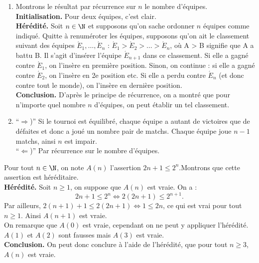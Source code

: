 \begin{Soln}{38}
\begin{enumerate}
\item Montrons le résultat par récurrence sur $n$ le nombre d'équipes.\\
\textbf{Initialisation.} Pour deux équipes, c'est clair.\\
\textbf{Hérédité.} Soit $n\in \N$ et supposons qu'on sache ordonner $n$ équipes comme indiqué. Quitte à renuméroter les équipes, supposons qu'on ait le classement suivant des équipes $\acute E_1,\ldots,\acute
E_n$ : $\acute E_1 > \acute E_2 > \ldots > \acute E_n$, où A > B signifie que A a battu B. Il s'agit d'insérer l'équipe $\acute E_{n+1}$ dans ce classement. Si elle a gagné contre $\acute E_1$, on l'insère en première position. Sinon, on continue : si elle a gagné contre $\acute E_2$, on l'insère en 2e position etc. Si elle a perdu contre $\acute E_n$ (et donc contre tout le monde), on l'insère en dernière position.\\
\textbf{Conclusion.} D'après le principe de récurrence, on a montré que pour n'importe quel nombre $n$ d'équipes, on peut établir un tel classement.\\
\item “$\Rightarrow$)” Si le tournoi est équilibré, chaque équipe a autant de victoires que de défaites et donc a joué un nombre pair de matchs. Chaque équipe joue $n-1$ matchs, ainsi $n$ est impair.\\
“$\Leftarrow$)” Par récurrence sur le nombre d'équipes.
\end{enumerate}
\end{Soln}
\begin{Soln}{39}
Pour tout $n \in \N$, on note $A(n)$ l'assertion \og $2n+1 \leq 2^n$.\fg Montrons que cette assertion est héréditaire.\\
\textbf{Hérédité.} Soit $n \geq 1$, on suppose que $A(n)$ est vraie. On a :
$$2n+1 \leq 2^n \Leftrightarrow 2(2n+1) \leq 2^{n+1}.$$
Par ailleurs, $2(n+1)+1 \leq 2(2n+1) \Leftrightarrow 1 \leq 2n$, ce qui est vrai pour tout $n \geq 1$.
Ainsi $A(n+1)$ est vraie.\\
On remarque que $A(0)$ est vraie, cependant on ne peut y appliquer l'hérédité. $A(1)$ et $A(2)$ sont fausses mais $A(3)$ est vraie. \\
\textbf{Conclusion.} On peut donc conclure à l'aide de l'hérédité, que pour tout $n \geq 3$, $A(n)$ est vraie.
\end{Soln}
